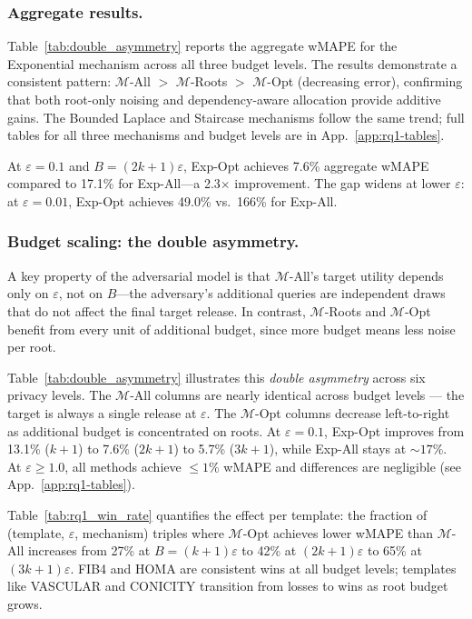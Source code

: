 \subsubsection{Aggregate results.}
Table~\ref{tab:double_asymmetry} reports the aggregate wMAPE for the Exponential mechanism across all three budget levels. The results demonstrate a consistent pattern: $\mathcal{M}$-All $>$ $\mathcal{M}$-Roots $>$ $\mathcal{M}$-Opt (decreasing error), confirming that both root-only noising and dependency-aware allocation provide additive gains. The Bounded Laplace and Staircase mechanisms follow the same trend; full tables for all three mechanisms and budget levels are in App.~\ref{app:rq1-tables}.

At $\varepsilon = 0.1$ and $B = (2k{+}1)\varepsilon$, Exp-Opt achieves 7.6\% aggregate wMAPE compared to 17.1\% for Exp-All---a 2.3$\times$ improvement. The gap widens at lower $\varepsilon$: at $\varepsilon = 0.01$, Exp-Opt achieves 49.0\% vs.\ 166\% for Exp-All.

\subsubsection{\textbf{Budget scaling: the double asymmetry.}}
\label{sec:double-asymmetry}

A key property of the adversarial model is that $\mathcal{M}$-All's target utility depends only on $\varepsilon$, not on $B$---the adversary's additional queries are independent draws that do not affect the final target release. In contrast, $\mathcal{M}$-Roots and $\mathcal{M}$-Opt benefit from every unit of additional budget, since more budget means less noise per root.

Table~\ref{tab:double_asymmetry} illustrates this \emph{double asymmetry} across six privacy levels. The $\mathcal{M}$-All columns are nearly identical across budget levels --- the target is always a single release at $\varepsilon$. The $\mathcal{M}$-Opt columns decrease left-to-right as additional budget is concentrated on roots. At $\varepsilon = 0.1$, Exp-Opt improves from 13.1\% ($k{+}1$) to 7.6\% ($2k{+}1$) to 5.7\% ($3k{+}1$), while Exp-All stays at ${\sim}17\%$. At $\varepsilon \geq 1.0$, all methods achieve $\leq 1\%$ wMAPE and differences are negligible (see App.~\ref{app:rq1-tables}).

Table~\ref{tab:rq1_win_rate} quantifies the effect per template: the fraction of (template, $\varepsilon$, mechanism) triples where $\mathcal{M}$-Opt achieves lower wMAPE than $\mathcal{M}$-All increases from 27\% at $B = (k{+}1)\varepsilon$ to 42\% at $(2k{+}1)\varepsilon$ to 65\% at $(3k{+}1)\varepsilon$. FIB4 and HOMA are consistent wins at all budget levels; templates like VASCULAR and CONICITY transition from losses to wins as root budget grows.

